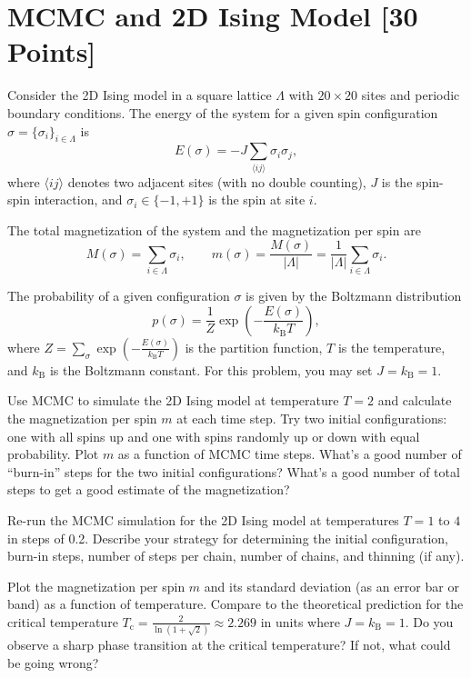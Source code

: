 \newpage
\section{MCMC and 2D Ising Model [30 Points]}

Consider the 2D Ising model in a square lattice $\Lambda$ with $20\times 20$ sites and periodic boundary conditions.
The energy of the system for a given spin configuration $\sigma = \{\sigma_i\}_{i\in \Lambda}$ is
\begin{equation}
  E(\sigma) = -J\sum_{\langle ij\rangle} \sigma_i\sigma_j,
\end{equation}
where $\langle i j \rangle$ denotes two adjacent sites (with no double counting), $J$ is the spin-spin interaction, and $\sigma_i \in \{ -1, +1\}$ is the spin at site $i$.

The total magnetization of the system and the magnetization per spin are
\begin{equation}
  M(\sigma) = \sum_{i\in \Lambda} \sigma_i, \qquad m(\sigma) = \frac{M(\sigma)}{|\Lambda|} = \frac{1}{|\Lambda|}\sum_{i\in \Lambda} \sigma_i.
\end{equation}

The probability of a given configuration $\sigma$ is given by the Boltzmann distribution
\begin{equation}
  p(\sigma) = \frac{1}{Z}\exp \left(-\frac{E(\sigma)}{k_\mathrm{B}T}\right),
\end{equation}
where $Z = \sum_{\sigma} \exp \left(-\frac{E(\sigma)}{k_\mathrm{B}T}\right)$ is the partition function, $T$ is the temperature, and $k_\mathrm{B}$ is the Boltzmann constant.
For this problem, you may set $J=k_\mathrm{B}=1$.

\begin{problem}[10]
Use MCMC to simulate the 2D Ising model at temperature $T=2$ and calculate the magnetization per spin $m$ at each time step.
Try two initial configurations: one with all spins up and one with spins randomly up or down with equal probability.
Plot $m$ as a function of MCMC time steps.
What's a good number of ``burn-in'' steps for the two initial configurations?
What's a good number of total steps to get a good estimate of the magnetization?
\end{problem}

\begin{solution}
\end{solution}

\begin{problem}[20]
Re-run the MCMC simulation for the 2D Ising model at temperatures $T=1$ to $4$ in steps of 0.2.
Describe your strategy for determining the initial configuration, burn-in steps, number of steps per chain, number of chains, and thinning (if any).

Plot the magnetization per spin $m$ and its standard deviation (as an error bar or band) as a function of temperature.
Compare to the theoretical prediction for the critical temperature $T_\mathrm{c}=\frac{2}{\ln(1+\sqrt{2})}\approx 2.269$ in units where $J=k_\mathrm{B}=1$.
Do you observe a sharp phase transition at the critical temperature?
If not, what could be going wrong?
\end{problem}

